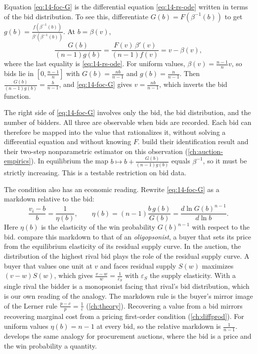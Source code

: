 Equation \eqref{eq:14-foc-G} is the differential equation \eqref{eq:14-rs-ode} written in terms of the bid distribution. To see this, differentiate $G(b)=F(\beta^{-1}(b))$ to get $g(b)=\frac{f(\beta^{-1}(b))}{\beta'(\beta^{-1}(b))}$. At $b=\beta(v)$,
\[
\frac{G(b)}{(n-1)g(b)}=\frac{F(v)\,\beta'(v)}{(n-1)f(v)}=v-\beta(v),
\]
where the last equality is \eqref{eq:14-rs-ode}. For uniform values, $\beta(v)=\frac{n-1}{n}v$, so bids lie in $[0,\frac{n-1}{n}]$ with $G(b)=\frac{nb}{n-1}$ and $g(b)=\frac{n}{n-1}$. Then $\frac{G(b)}{(n-1)g(b)}=\frac{b}{n-1}$, and \eqref{eq:14-foc-G} gives $v=\frac{nb}{n-1}$, which inverts the bid function.

The right side of \eqref{eq:14-foc-G} involves only the bid, the bid distribution, and the number of bidders. All three are observable when bids are recorded. Each bid can therefore be mapped into the value that rationalizes it, without solving a differential equation and without knowing $F$.  build their identification result and their two-step nonparametric estimator on this observation (\cref{ch:auction-empirics}). In equilibrium the map $b\mapsto b+\frac{G(b)}{(n-1)g(b)}$ equals $\beta^{-1}$, so it must be strictly increasing. This is a testable restriction on bid data.

The condition also has an economic reading. Rewrite \eqref{eq:14-foc-G} as a markdown relative to the bid:
\begin{equation}\label{eq:14-markdown}
\frac{v_i-b}{b}=\frac{1}{\eta(b)},\qquad \eta(b)=(n-1)\frac{b\,g(b)}{G(b)}=\frac{d\ln G(b)^{n-1}}{d\ln b}.
\end{equation}
Here $\eta(b)$ is the elasticity of the win probability $G(b)^{n-1}$ with respect to the bid.  compare this markdown to that of an \emph{oligopsonist}, a buyer that sets its price from the equilibrium elasticity of its residual supply curve. In the auction, the distribution of the highest rival bid plays the role of the residual supply curve. A buyer that values one unit at $v$ and faces residual supply $S(w)$ maximizes $(v-w)S(w)$, which gives $\frac{v-w}{w}=\frac{1}{\varepsilon_S}$ with $\varepsilon_S$ the supply elasticity. With a single rival the bidder is a monopsonist facing that rival's bid distribution, which is our own reading of the analogy. The markdown rule is the buyer's mirror image of the Lerner rule $\frac{p-c}{p}=\frac{1}{\varepsilon}$ (\cref{ch:theory}). Recovering a value from a bid mirrors recovering marginal cost from a pricing first-order condition (\cref{ch:diffprod}). For uniform values $\eta(b)=n-1$ at every bid, so the relative markdown is $\frac{1}{n-1}$.  develops the same analogy for procurement auctions, where the bid is a price and the win probability a quantity.

